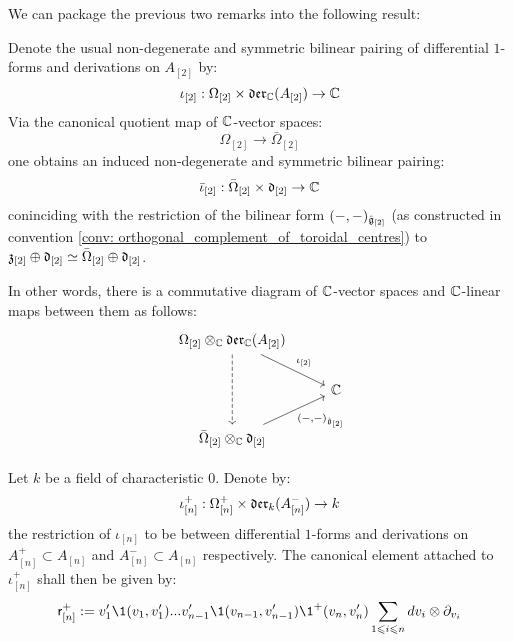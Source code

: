        We can package the previous two remarks into the following result:
        \begin{proposition} \label{prop: pairing_cyclic_1_forms_and_div_zero_vector_fields} 
            Denote the usual non-degenerate and symmetric bilinear pairing of differential $1$-forms and derivations on $A_{[2]}$ by:
                $$\iota_{[2]}: \Omega_{[2]} \x \der_{\bbC}(A_{[2]}) \to \bbC$$
            Via the canonical quotient map of $\mathbb{C}$-vector spaces:
                $$\Omega_{[2]} \to \bar{\Omega}_{[2]}$$
            one obtains an induced non-degenerate and symmetric bilinear pairing:
                $$\bar{\iota}_{[2]}: \bar{\Omega}_{[2]} \x \d_{[2]} \to \bbC$$
            coninciding with the restriction of the bilinear form $(-, -)_{\hat{\mathfrak{g}}_{[2]}}$ (as constructed in convention \ref{conv: orthogonal_complement_of_toroidal_centres}) to $\mathfrak{z}_{[2]} \oplus \mathfrak{d}_{[2]} \simeq \bar{\Omega}_{[2]} \oplus \mathfrak{d}_{[2]}$.
            
            In other words, there is a commutative diagram of $\mathbb{C}$-vector spaces and $\mathbb{C}$-linear maps between them as follows:
                $$
                    \begin{tikzcd}
                	{\Omega_{[2]} \tensor_{\bbC} \der_{\bbC}(A_{[2]})} \\
                	& \bbC \\
                	{\bar{\Omega}_{[2]} \tensor_{\bbC} \d_{[2]}}
                	\arrow[dashed, from=1-1, to=3-1]
                	\arrow["{\iota_{[2]}}", from=1-1, to=2-2]
                	\arrow["{(-, -)_{\hat{\g}_{[2]}}}"', from=3-1, to=2-2]
                    \end{tikzcd}
                $$
        \end{proposition}
        \begin{lemma} \label{lemma: canonical_elements_for_the_canonical_pairing_of_1_forms_and_vector_fields}
            Let $k$ be a field of characteristic $0$. Denote by:
                $$\iota_{[n]}^+: \Omega_{[n]}^+ \x \der_k(A_{[n]}^-) \to k$$
            the restriction of $\iota_{[n]}$ to be between differential $1$-forms and derivations on $A_{[n]}^+ \subset A_{[n]}$ and $A_{[n]}^- \subset A_{[n]}$ respectively. The canonical element attached to $\iota_{[n]}^+$ shall then be given by:
                $$\sfr_{[n]}^+ := v_1' \1(v_1, v_1') ... v_{n - 1}' \1(v_{n - 1}, v_{n - 1}') \1^+(v_n, v_n') \sum_{1 \leq i \leq n} dv_i \tensor \del_{v_i}$$
        \end{lemma}
